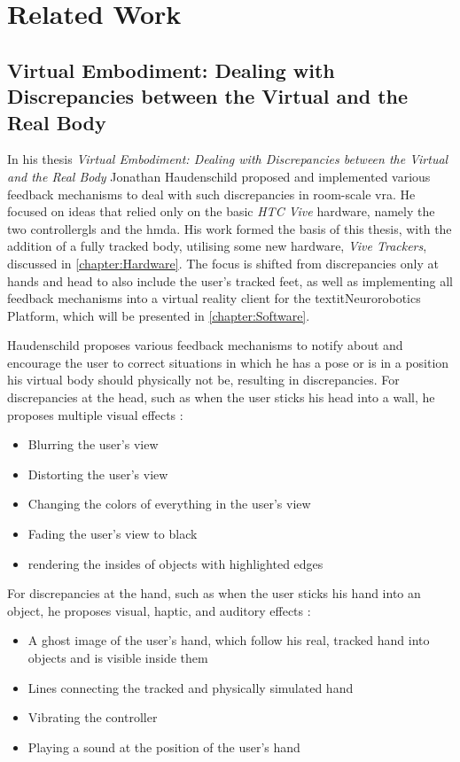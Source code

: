 
\chapter{Related Work}\label{chapter:RelatedWork}

\section{Virtual Embodiment: Dealing with Discrepancies between the Virtual and the Real Body}

In his thesis \textit{Virtual Embodiment:  Dealing with Discrepancies between the Virtual and the Real Body} \autocite{JohnnyVEThesis} Jonathan Haudenschild proposed and implemented various feedback mechanisms to deal with such discrepancies in room-scale \gls{vra}. He focused on ideas that relied only on the basic \textit{HTC Vive} hardware, namely the two \glspl{controllergl} and the \gls{hmda}.
\newline
His work formed the basis of this thesis, with the addition of a fully tracked body, utilising some new hardware, \textit{Vive Trackers}, discussed in \autoref{chapter:Hardware}. The focus is shifted from discrepancies only at hands and head to also include the user's tracked feet, as well as implementing all feedback mechanisms into a virtual reality client for the textit{Neurorobotics Platform}, which will be presented in \autoref{chapter:Software}.
\newline

Haudenschild proposes various feedback mechanisms to notify about and encourage the user to correct situations in which he has a pose or is in a position his virtual body should physically not be, resulting in discrepancies.
\newline
For discrepancies at the head, such as when the user sticks his head into a wall, he proposes multiple visual effects \autocite[p. ~20]{JohnnyVEThesis}:
\begin{itemize}
    \item Blurring the user's view
    \item Distorting the user's view
    \item Changing the colors of everything in the user's view
    \item Fading the user's view to black
    \item rendering the insides of objects with highlighted edges
\end{itemize}
For discrepancies at the hand, such as when the user sticks his hand into an object, he proposes visual, haptic, and auditory effects \autocite[p. ~24-25]{JohnnyVEThesis}:
\begin{itemize}
    \item A ghost image of the user's hand, which follow his real, tracked hand into objects and is visible inside them
    \item Lines connecting the tracked and physically simulated hand
    \item Vibrating the controller
    \item Playing a sound at the position of the user's hand
\end{itemize}

